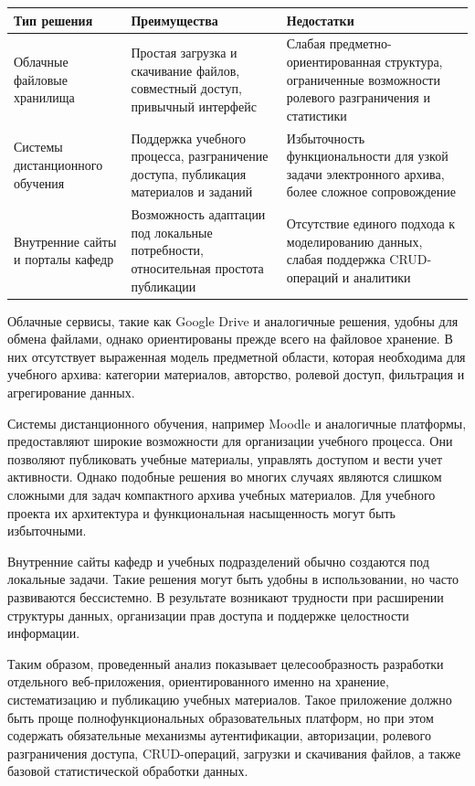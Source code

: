 \begin{center}
\begin{tabularx}{0.96\textwidth}{>{\raggedright\arraybackslash}p{3.8cm} >{\raggedright\arraybackslash}X >{\raggedright\arraybackslash}X}
\toprule
\textbf{Тип решения} & \textbf{Преимущества} & \textbf{Недостатки} \\
\midrule
Облачные файловые хранилища & Простая загрузка и скачивание файлов, совместный доступ, привычный интерфейс & Слабая предметно-ориентированная структура, ограниченные возможности ролевого разграничения и статистики \\
Системы дистанционного обучения & Поддержка учебного процесса, разграничение доступа, публикация материалов и заданий & Избыточность функциональности для узкой задачи электронного архива, более сложное сопровождение \\
Внутренние сайты и порталы кафедр & Возможность адаптации под локальные потребности, относительная простота публикации & Отсутствие единого подхода к моделированию данных, слабая поддержка CRUD-операций и аналитики \\
\bottomrule
\end{tabularx}
\end{center}

Облачные сервисы, такие как Google Drive и аналогичные решения, удобны для обмена файлами, однако ориентированы прежде всего на файловое хранение. В них отсутствует выраженная модель предметной области, которая необходима для учебного архива: категории материалов, авторство, ролевой доступ, фильтрация и агрегирование данных.

Системы дистанционного обучения, например Moodle и аналогичные платформы, предоставляют широкие возможности для организации учебного процесса. Они позволяют публиковать учебные материалы, управлять доступом и вести учет активности. Однако подобные решения во многих случаях являются слишком сложными для задач компактного архива учебных материалов. Для учебного проекта их архитектура и функциональная насыщенность могут быть избыточными.

Внутренние сайты кафедр и учебных подразделений обычно создаются под локальные задачи. Такие решения могут быть удобны в использовании, но часто развиваются бессистемно. В результате возникают трудности при расширении структуры данных, организации прав доступа и поддержке целостности информации.

Таким образом, проведенный анализ показывает целесообразность разработки отдельного веб-приложения, ориентированного именно на хранение, систематизацию и публикацию учебных материалов. Такое приложение должно быть проще полнофункциональных образовательных платформ, но при этом содержать обязательные механизмы аутентификации, авторизации, ролевого разграничения доступа, CRUD-операций, загрузки и скачивания файлов, а также базовой статистической обработки данных.

